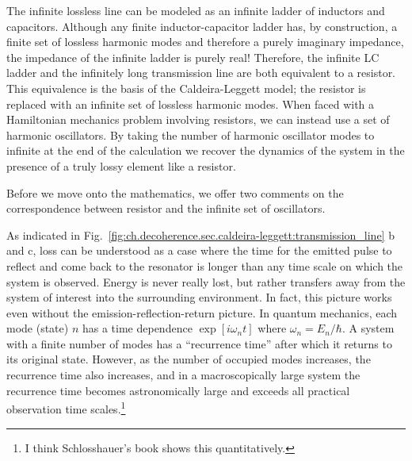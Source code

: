 The infinite lossless line can be modeled as an infinite ladder of inductors and capacitors.
Although any finite inductor-capacitor ladder has, by construction, a finite set of lossless harmonic modes and therefore a purely imaginary impedance, the impedance of the infinite ladder is purely real!
Therefore, the infinite LC ladder and the infinitely long transmission line are both equivalent to a resistor.
This equivalence is the basis of the Caldeira-Leggett model; the resistor is replaced with an infinite set of lossless harmonic modes.
When faced with a Hamiltonian mechanics problem involving resistors, we can instead use a set of harmonic oscillators.
By taking the number of harmonic oscillator modes to infinite at the end of the calculation we recover the dynamics of the system in the presence of a truly lossy element like a resistor.

Before we move onto the mathematics, we offer two comments on the correspondence between resistor and the infinite set of oscillators.

As indicated in Fig.~\ref{fig:ch.decoherence.sec.caldeira-leggett:transmission_line} b and c, loss can be understood as a case where the time for the emitted pulse to reflect and come back to the resonator is longer than any time scale on which the system is observed.
Energy is never really lost, but rather transfers away from the system of interest into the surrounding environment.
In fact, this picture works even without the emission-reflection-return picture.
In quantum mechanics, each mode (state) $n$ has a time dependence $\exp [ i \omega_n t]$ where $\omega_n = E_n/\hbar$.
A system with a finite number of modes has a ``recurrence time'' after which it returns to its original state.
However, as the number of occupied modes increases, the recurrence time also increases, and in a macroscopically large system the recurrence time becomes astronomically large and exceeds all practical observation time scales.\footnote{I think Schlosshauer's book shows this quantitatively.}

